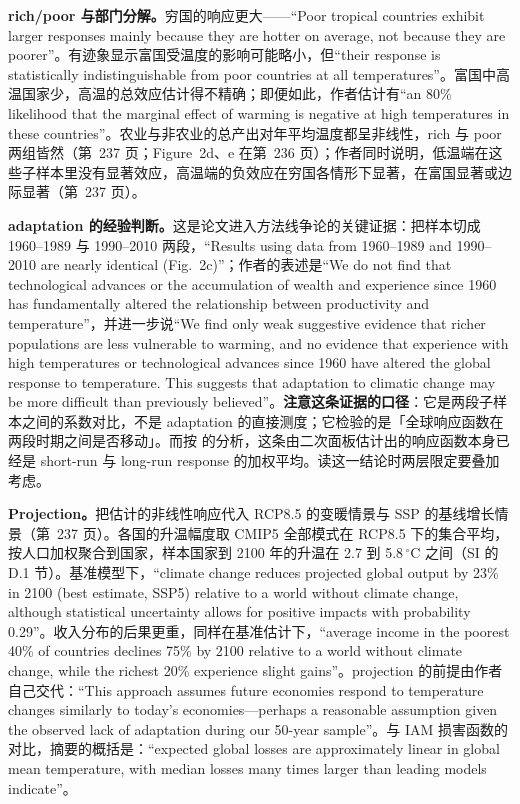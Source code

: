 \textbf{rich/poor 与部门分解。}穷国的响应更大——``Poor tropical countries exhibit larger responses mainly because they are hotter on average, not because they are poorer''\citep[第~237 页]{burke2015global}。有迹象显示富国受温度的影响可能略小，但``their response is statistically indistinguishable from poor countries at all temperatures''\citep[第~237 页]{burke2015global}。富国中高温国家少，高温的总效应估计得不精确；即便如此，作者估计有``an 80\% likelihood that the marginal effect of warming is negative at high temperatures in these countries''\citep[第~237 页]{burke2015global}。农业与非农业的总产出对年平均温度都呈非线性，rich 与 poor 两组皆然（第~237 页；Figure~2d、e 在第~236 页）；作者同时说明，低温端在这些子样本里没有显著效应，高温端的负效应在穷国各情形下显著，在富国显著或边际显著（第~237 页）。

\textbf{adaptation 的经验判断。}这是论文进入方法线争论的关键证据：把样本切成 1960--1989 与 1990--2010 两段，``Results using data from 1960–1989 and 1990–2010 are nearly identical (Fig.~2c)''\citep[第~237 页]{burke2015global}；作者的表述是``We do not find that technological advances or the accumulation of wealth and experience since 1960 has fundamentally altered the relationship between productivity and temperature''\citep[第~237 页]{burke2015global}，并进一步说``We find only weak suggestive evidence that richer populations are less vulnerable to warming, and no evidence that experience with high temperatures or technological advances since 1960 have altered the global response to temperature. This suggests that adaptation to climatic change may be more difficult than previously believed''\citep[第~237 页]{burke2015global}。\textbf{注意这条证据的口径}：它是两段子样本之间的系数对比，不是 adaptation 的直接测度；它检验的是「全球响应函数在两段时期之间是否移动」。而按  的分析，这条由二次面板估计出的响应函数本身已经是 short-run 与 long-run response 的加权平均。读这一结论时两层限定要叠加考虑。

\textbf{Projection。}把估计的非线性响应代入 RCP8.5 的变暖情景与 SSP 的基线增长情景（第~237 页）。各国的升温幅度取 CMIP5 全部模式在 RCP8.5 下的集合平均，按人口加权聚合到国家，样本国家到 2100 年的升温在 2.7 到 5.8\,$^\circ$C 之间（SI 的 D.1 节）。基准模型下，``climate change reduces projected global output by 23\% in 2100 (best estimate, SSP5) relative to a world without climate change, although statistical uncertainty allows for positive impacts with probability 0.29''\citep[第~238 页]{burke2015global}。收入分布的后果更重，同样在基准估计下，``average income in the poorest 40\% of countries declines 75\% by 2100 relative to a world without climate change, while the richest 20\% experience slight gains''\citep[第~238 页]{burke2015global}。projection 的前提由作者自己交代：``This approach assumes future economies respond to temperature changes similarly to today's economies—perhaps a reasonable assumption given the observed lack of adaptation during our 50-year sample''\citep[第~237 页]{burke2015global}。与 IAM 损害函数的对比，摘要的概括是：``expected global losses are approximately linear in global mean temperature, with median losses many times larger than leading models indicate''\citep[第~235 页]{burke2015global}。

